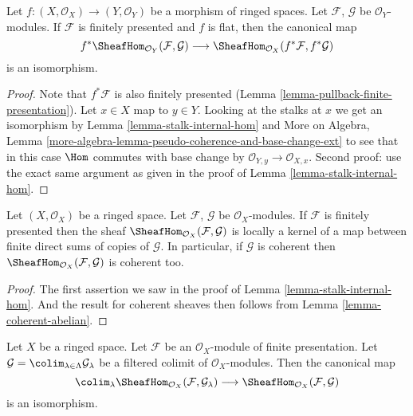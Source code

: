 \begin{lemma}
\label{lemma-pullback-internal-hom}
Let $f : (X, \mathcal{O}_X) \to (Y, \mathcal{O}_Y)$ be a morphism
of ringed spaces. Let $\mathcal{F}$, $\mathcal{G}$ be $\mathcal{O}_Y$-modules.
If $\mathcal{F}$ is finitely presented and $f$ is flat,
then the canonical map
$$
f^*\SheafHom_{\mathcal{O}_Y}(\mathcal{F}, \mathcal{G})
\longrightarrow
\SheafHom_{\mathcal{O}_X}(f^*\mathcal{F}, f^*\mathcal{G})
$$
is an isomorphism.
\end{lemma}

\begin{proof}
Note that $f^*\mathcal{F}$ is also finitely presented
(Lemma \ref{lemma-pullback-finite-presentation}).
Let $x \in X$ map to $y \in Y$. Looking at the stalks
at $x$ we get an isomorphism by
Lemma \ref{lemma-stalk-internal-hom} and
More on Algebra, Lemma
\ref{more-algebra-lemma-pseudo-coherence-and-base-change-ext}
to see that in this case $\Hom$ commutes with base change by
$\mathcal{O}_{Y, y} \to \mathcal{O}_{X, x}$.
Second proof: use the exact same argument as given
in the proof of Lemma \ref{lemma-stalk-internal-hom}.
\end{proof}

\begin{lemma}
\label{lemma-internal-hom-locally-kernel-direct-sum}
Let $(X, \mathcal{O}_X)$ be a ringed space.
Let $\mathcal{F}$, $\mathcal{G}$ be $\mathcal{O}_X$-modules.
If $\mathcal{F}$ is finitely presented then the sheaf
$\SheafHom_{\mathcal{O}_X}(\mathcal{F}, \mathcal{G})$ is
locally a kernel of a map between finite direct sums
of copies of $\mathcal{G}$.
In particular, if $\mathcal{G}$ is coherent then
$\SheafHom_{\mathcal{O}_X}(\mathcal{F}, \mathcal{G})$
is coherent too.
\end{lemma}

\begin{proof}
The first assertion
we saw in the proof of Lemma \ref{lemma-stalk-internal-hom}.
And the result for coherent sheaves then follows from
Lemma \ref{lemma-coherent-abelian}.
\end{proof}

\begin{lemma}
\label{lemma-hom-finite-presentation-colimit}
Let $X$ be a ringed space. Let $\mathcal{F}$ be an $\mathcal{O}_X$-module
of finite presentation. Let
$\mathcal{G} = \colim_{\lambda \in \Lambda} \mathcal{G}_\lambda$
be a filtered colimit of $\mathcal{O}_X$-modules. Then the canonical map
$$
\colim_\lambda \SheafHom_{\mathcal{O}_X}(\mathcal{F}, \mathcal{G}_\lambda)
\longrightarrow
\SheafHom_{\mathcal{O}_X}(\mathcal{F}, \mathcal{G})
$$
is an isomorphism.
\end{lemma}

